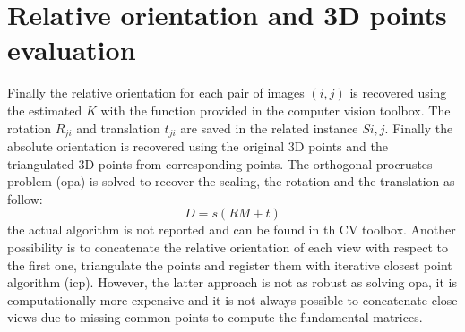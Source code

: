 \documentclass[11pt]{article}
\begin{document}
\newpage
\section{Relative orientation and 3D points evaluation}
Finally the relative orientation for each pair of images $(i,j)$ is recovered using the estimated $K$ with the function provided in the computer vision toolbox. The rotation $R_{ji}$ and translation $t_{ji}$ are saved in the related instance $S{i,j}$. Finally the absolute orientation is recovered using the original 3D points and the triangulated 3D points from corresponding points. The orthogonal procrustes problem (opa) is solved to recover the scaling, the rotation and the translation as follow:
\begin{equation}
    D=s(RM+t)
\end{equation}
the actual algorithm is not reported and can be found in th CV toolbox. Another possibility is to concatenate the relative orientation of each view with respect to the first one, triangulate the points and register them with iterative closest point algorithm (icp). However, the latter approach is not as robust as solving opa, it is computationally more expensive and it is not always possible to concatenate close views due to missing common points to compute the fundamental matrices.
\end{document}
